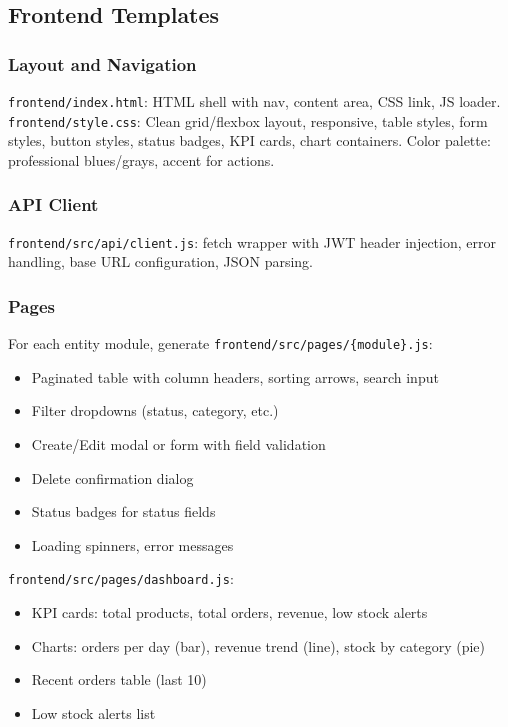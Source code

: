 \documentclass[11pt,a4paper]{article}
\begin{document}
\subsection{Frontend Templates}

\subsubsection{Layout and Navigation}

\texttt{frontend/index.html}: HTML shell with nav, content area, CSS link, JS loader.
\texttt{frontend/style.css}: Clean grid/flexbox layout, responsive, table styles,
form styles, button styles, status badges, KPI cards, chart containers.
Color palette: professional blues/grays, accent for actions.

\subsubsection{API Client}

\texttt{frontend/src/api/client.js}: fetch wrapper with JWT header injection,
error handling, base URL configuration, JSON parsing.

\subsubsection{Pages}

For each entity module, generate \texttt{frontend/src/pages/\{module\}.js}:
\begin{itemize}
\item Paginated table with column headers, sorting arrows, search input
\item Filter dropdowns (status, category, etc.)
\item Create/Edit modal or form with field validation
\item Delete confirmation dialog
\item Status badges for status fields
\item Loading spinners, error messages
\end{itemize}

\texttt{frontend/src/pages/dashboard.js}:
\begin{itemize}
\item KPI cards: total products, total orders, revenue, low stock alerts
\item Charts: orders per day (bar), revenue trend (line), stock by category (pie)
\item Recent orders table (last 10)
\item Low stock alerts list
\end{itemize}
\end{document}
